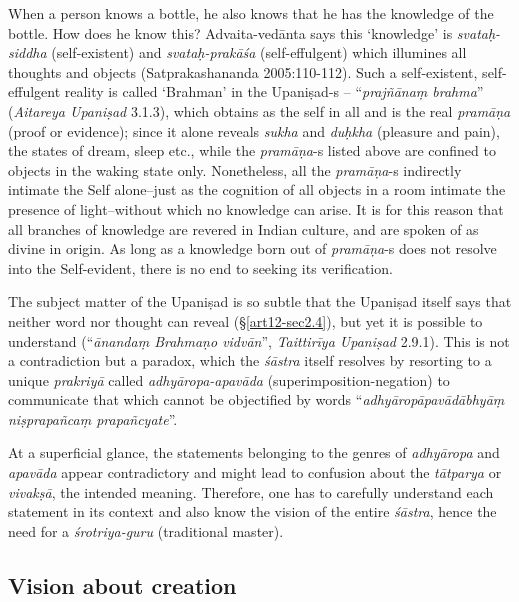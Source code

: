 When a person knows a bottle, he also knows that he has the knowledge of the bottle. How does he know this? Advaita-vedānta says this `knowledge' is {\sl svataḥ-siddha} (self-existent) and {\sl svataḥ-prakāśa} (self-effulgent) which illumines all thoughts and objects (Satprakashananda 2005:110-112). Such a self-existent, self-effulgent reality is called `Brahman' in the Upaniṣad-s -- ``{\sl prajñānaṃ brahma}'' ({\sl Aitareya Upaniṣad} 3.1.3), which obtains as the self in all and is the real {\sl pramāṇa} (proof or evidence); since it alone reveals {\sl sukha} and {\sl duḥkha} (pleasure and pain), the states of dream, sleep etc., while the {\sl pramāṇa}-s listed above are conﬁned to objects in the waking state only. Nonetheless, all the {\sl pramāṇa}-s indirectly intimate the Self alone--just as the cognition of all objects in a room intimate the presence of light--without which no knowledge can arise. It is for this reason that all branches of knowledge are revered in Indian culture, and are spoken of as divine in origin. As long as a knowledge born out of {\sl pra\-mā\-ṇa}-s does not resolve into the Self-evident, there is no end to seeking its veriﬁcation.

The subject matter of the Upaniṣad is so subtle that the Upaniṣad itself says that neither word nor thought can reveal (\S\ref{art12-sec2.4}), but yet it is possible to understand (``{\sl ānandaṃ Brahmaṇo vidvān}'', {\sl Taittirīya Upaniṣad} 2.9.1). This is not a contradiction but a paradox, which the {\sl śāstra} itself resolves by resorting to a unique {\sl prakriyā} called {\sl adhyāropa-apavāda} (superimposition-negation) to communicate that which cannot be objectiﬁed by words ``{\sl adhyāropāpavādābhyāṃ niṣprapañcaṃ prapañcyate}''. 

At a superﬁcial glance, the statements belonging to the genres of {\sl adhyāropa} and {\sl apavāda} appear contradictory and might lead to confusion about the {\sl tātparya} or {\sl vivakṣā}, the intended meaning. Therefore, one has to carefully understand each statement in its context and also know the vision of the entire {\sl śāstra}, hence the need for a {\sl śrotriya-guru} (traditional master).\\[-20pt]

\subsection{Vision about creation}\label{art12-sec2.3}


